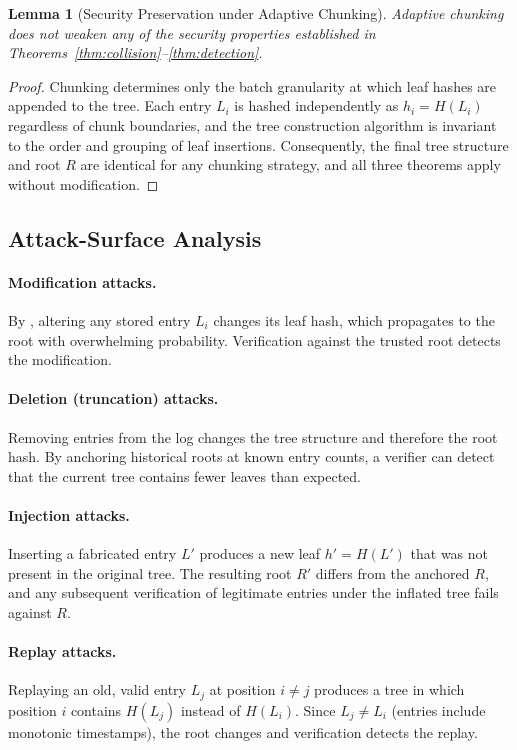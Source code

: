 \documentclass[preprint,12pt]{elsarticle}
\newtheorem{lemma}[theorem]{Lemma}
\begin{document}
\begin{lemma}[Security Preservation under Adaptive Chunking]
\label{lem:chunking}
Adaptive chunking does not weaken any of the security properties established in Theorems~\ref{thm:collision}--\ref{thm:detection}.
\end{lemma}
\begin{proof}
Chunking determines only the batch granularity at which leaf hashes are appended to the tree.
Each entry $L_i$ is hashed independently as $h_i = H(L_i)$ regardless of chunk boundaries, and the tree construction algorithm is invariant to the order and grouping of leaf insertions.
Consequently, the final tree structure and root $R$ are identical for any chunking strategy, and all three theorems apply without modification.
\end{proof}

\subsection{Attack-Surface Analysis}

\paragraph{Modification attacks.}
By , altering any stored entry $L_i$ changes its leaf hash, which propagates to the root with overwhelming probability.
Verification against the trusted root detects the modification.

\paragraph{Deletion (truncation) attacks.}
Removing entries from the log changes the tree structure and therefore the root hash.
By anchoring historical roots at known entry counts, a verifier can detect that the current tree contains fewer leaves than expected.

\paragraph{Injection attacks.}
Inserting a fabricated entry $L'$ produces a new leaf $h' = H(L')$ that was not present in the original tree.
The resulting root $R'$ differs from the anchored $R$, and any subsequent verification of legitimate entries under the inflated tree fails against $R$.

\paragraph{Replay attacks.}
Replaying an old, valid entry $L_j$ at position $i \neq j$ produces a tree in which position $i$ contains $H(L_j)$ instead of $H(L_i)$.
Since $L_j \neq L_i$ (entries include monotonic timestamps), the root changes and verification detects the replay.
\end{document}
